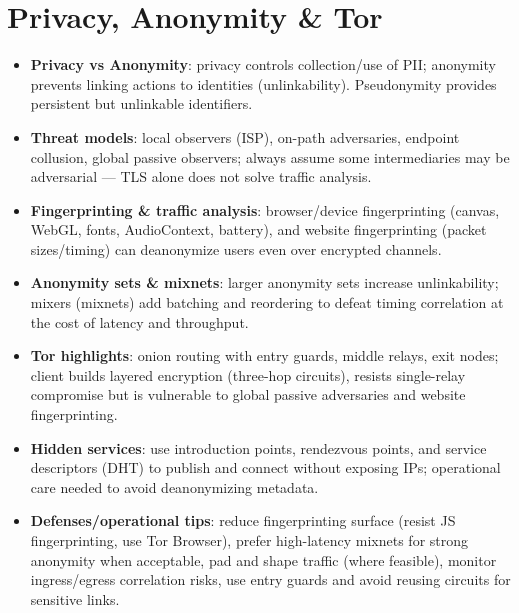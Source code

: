 \documentclass[11pt]{article}
\begin{document}
\section{Privacy, Anonymity \& Tor}

\begin{itemize}
  \item \textbf{Privacy vs Anonymity}: privacy controls collection/use of PII; anonymity prevents linking actions to identities (unlinkability). Pseudonymity provides persistent but unlinkable identifiers.
  
  \item \textbf{Threat models}: local observers (ISP), on-path adversaries, endpoint collusion, global passive observers; always assume some intermediaries may be adversarial --- TLS alone does not solve traffic analysis.
  
  \item \textbf{Fingerprinting \& traffic analysis}: browser/device fingerprinting (canvas, WebGL, fonts, AudioContext, battery), and website fingerprinting (packet sizes/timing) can deanonymize users even over encrypted channels.
  
  \item \textbf{Anonymity sets \& mixnets}: larger anonymity sets increase unlinkability; mixers (mixnets) add batching and reordering to defeat timing correlation at the cost of latency and throughput.
  
  \item \textbf{Tor highlights}: onion routing with entry guards, middle relays, exit nodes; client builds layered encryption (three-hop circuits), resists single-relay compromise but is vulnerable to global passive adversaries and website fingerprinting.
  
  \item \textbf{Hidden services}: use introduction points, rendezvous points, and service descriptors (DHT) to publish and connect without exposing IPs; operational care needed to avoid deanonymizing metadata.
  
  \item \textbf{Defenses/operational tips}: reduce fingerprinting surface (resist JS fingerprinting, use Tor Browser), prefer high-latency mixnets for strong anonymity when acceptable, pad and shape traffic (where feasible), monitor ingress/egress correlation risks, use entry guards and avoid reusing circuits for sensitive links.
\end{itemize}
\end{document}
